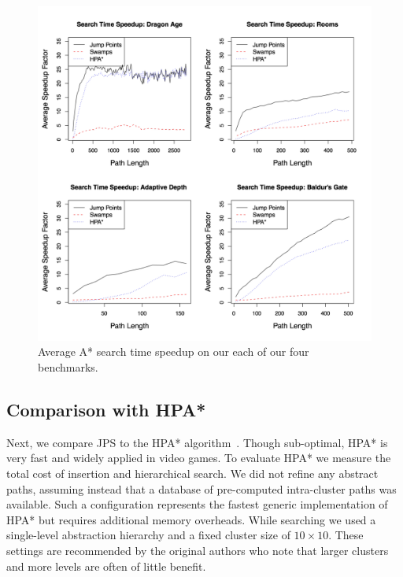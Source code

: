 \begin{figure}[t!]
   \begin{center}
	   \includegraphics[width=0.98\columnwidth]
		{chapter_jps/diagrams/speedup.pdf}
   \end{center}
   \caption[Search time speedup: JPS vs. Swamps vs. HPA]
{\small
Average A* search time speedup on our each of our four benchmarks. }

\label{fig::jps::speedup}
\end{figure}


\subsection{Comparison with HPA*}
Next, we compare JPS to the HPA* algorithm~\citep{botea04}.  Though
sub-optimal, HPA* is very fast and widely applied in video games.  To evaluate
HPA* we measure the total cost of insertion and hierarchical search. We did
not refine any abstract paths, assuming instead that a database of
pre-computed intra-cluster paths was available. Such a configuration
represents the fastest generic implementation of HPA* but requires additional
memory overheads.  While searching we used a single-level abstraction
hierarchy and a fixed cluster size of $10\times10$.  These settings are
recommended by the original authors who note that larger clusters and more
levels are often of little benefit.

